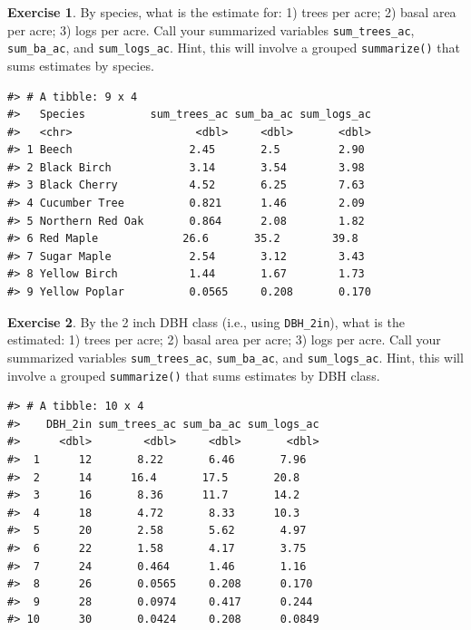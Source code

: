 \documentclass[
  11pt,
]{krantz}
\theoremstyle{definition}
\theoremstyle{definition}
\theoremstyle{definition}
\newtheorem{exercise}{Exercise}[chapter]
\theoremstyle{definition}
\theoremstyle{remark}
\begin{document}
\begin{exercise}
\protect\hypertarget{exr:tidyr3}{}\label{exr:tidyr3}By species, what is the estimate for: 1) trees per acre; 2) basal area per acre; 3) logs per acre. Call your summarized variables \texttt{sum\_trees\_ac}, \texttt{sum\_ba\_ac}, and \texttt{sum\_logs\_ac}. Hint, this will involve a grouped \texttt{summarize()} that sums estimates by species.
\end{exercise}

\begin{verbatim}
#> # A tibble: 9 x 4
#>   Species          sum_trees_ac sum_ba_ac sum_logs_ac
#>   <chr>                   <dbl>     <dbl>       <dbl>
#> 1 Beech                  2.45       2.5         2.90 
#> 2 Black Birch            3.14       3.54        3.98 
#> 3 Black Cherry           4.52       6.25        7.63 
#> 4 Cucumber Tree          0.821      1.46        2.09 
#> 5 Northern Red Oak       0.864      2.08        1.82 
#> 6 Red Maple             26.6       35.2        39.8  
#> 7 Sugar Maple            2.54       3.12        3.43 
#> 8 Yellow Birch           1.44       1.67        1.73 
#> 9 Yellow Poplar          0.0565     0.208       0.170
\end{verbatim}

\begin{exercise}
\protect\hypertarget{exr:tidyr4}{}\label{exr:tidyr4}By the 2 inch DBH class (i.e., using \texttt{DBH\_2in}), what is the estimated: 1) trees per acre; 2) basal area per acre; 3) logs per acre. Call your summarized variables \texttt{sum\_trees\_ac}, \texttt{sum\_ba\_ac}, and \texttt{sum\_logs\_ac}. Hint, this will involve a grouped \texttt{summarize()} that sums estimates by DBH class.
\end{exercise}

\begin{verbatim}
#> # A tibble: 10 x 4
#>    DBH_2in sum_trees_ac sum_ba_ac sum_logs_ac
#>      <dbl>        <dbl>     <dbl>       <dbl>
#>  1      12       8.22       6.46       7.96  
#>  2      14      16.4       17.5       20.8   
#>  3      16       8.36      11.7       14.2   
#>  4      18       4.72       8.33      10.3   
#>  5      20       2.58       5.62       4.97  
#>  6      22       1.58       4.17       3.75  
#>  7      24       0.464      1.46       1.16  
#>  8      26       0.0565     0.208      0.170 
#>  9      28       0.0974     0.417      0.244 
#> 10      30       0.0424     0.208      0.0849
\end{verbatim}
\end{document}
